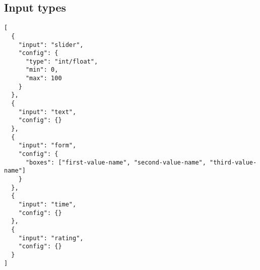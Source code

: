 \documentclass{article}
\begin{document}
\subsection{Input types}

\begin{verbatim}
[
  {
    "input": "slider",
    "config": {
      "type": "int/float",
      "min": 0,
      "max": 100
    }
  },
  {
    "input": "text",
    "config": {}
  },
  {
    "input": "form",
    "config": {
      "boxes": ["first-value-name", "second-value-name", "third-value-name"]
    }
  },
  {
    "input": "time",
    "config": {}
  },
  {
    "input": "rating",
    "config": {}
  }
]
\end{verbatim}
\end{document}
